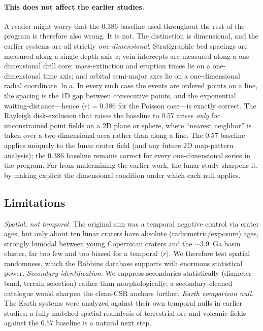 \documentclass[12pt,a4paper]{article}
\begin{document}
\paragraph{This does not affect the earlier studies.} A reader might worry that the $0.386$ baseline used throughout the rest of the program is therefore also wrong. It is not. The distinction is dimensional, and the earlier systems are all strictly \emph{one-dimensional}. Stratigraphic bed spacings are measured along a single depth axis $z$; vein intercepts are measured along a one-dimensional drill core; mass-extinction and eruption times lie on a one-dimensional time axis; and orbital semi-major axes lie on a one-dimensional radial coordinate $\ln a$. In every such case the events are ordered points on a line, the spacing is the 1D gap between consecutive points, and the exponential waiting-distance---hence $\langle r\rangle=0.386$ for the Poisson case---is exactly correct. The Rayleigh disk-exclusion that raises the baseline to $0.57$ arises \emph{only} for unconstrained point fields on a 2D plane or sphere, where ``nearest neighbor'' is taken over a two-dimensional area rather than along a line. The $0.57$ baseline applies uniquely to the lunar crater field (and any future 2D map-pattern analysis); the $0.386$ baseline remains correct for every one-dimensional series in the program. Far from undermining the earlier work, the lunar study sharpens it, by making explicit the dimensional condition under which each null applies.

\subsection{Limitations}

\emph{Spatial, not temporal.} The original aim was a temporal negative control via crater ages, but only about ten lunar craters have absolute (radiometric/exposure) ages, strongly bimodal between young Copernican craters and the $\sim$3.9~Ga basin cluster, far too few and too biased for a temporal $\langle r\rangle$. We therefore test spatial randomness, which the Robbins database supports with enormous statistical power. \emph{Secondary identification.} We suppress secondaries statistically (diameter band, terrain selection) rather than morphologically; a secondary-cleaned catalogue would sharpen the clean-CSR anchors further. \emph{Earth comparison null.} The Earth systems were analyzed against their own temporal nulls in earlier studies; a fully matched spatial reanalysis of terrestrial ore and volcanic fields against the $0.57$ baseline is a natural next step.
\end{document}

